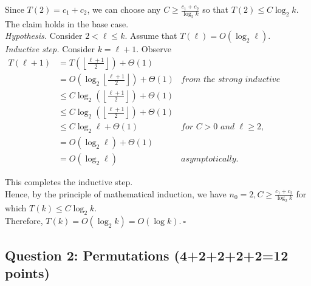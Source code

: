 \begin{solution}
\noindent Since $T(2)=c_1+c_2$, we can choose any $C\geq\frac{c_1+c_2}{\log_2{k}}$ so that $T(2)\leq C\log_2{k}$. The claim holds in the base case.\\

\noindent\textit{Hypothesis. }Consider $2<\ell\leq k$. Assume that $T(\ell)=O(\log_2\ell)$.\\

\noindent\textit{Inductive step. }Consider $k=\ell+1$. Observe
\begin{align*}
T(\ell+1)
&=T\left(\left\lfloor\frac{\ell+1}{2}\right\rfloor\right)+\Theta(1)\\
&=O\left(\log_2\left\lfloor\frac{\ell+1}{2}\right\rfloor\right)+\Theta(1)&\textit{from the strong inductive hypothesis,}\\
&\leq C\log_2\left(\left\lfloor\frac{\ell+1}{2}\right\rfloor\right)+\Theta(1)\\
&\leq C\log_2\left(\left\lfloor\frac{\ell+1}{2}\right\rfloor\right)+\Theta(1)\\
&\leq C\log_2\ell+\Theta(1)&\textit{for $C>0$ and $\ell\geq 2,$}\\
&=O(\log_2\ell)+\Theta(1)\\
&=O(\log_2\ell)&\textit{asymptotically.}
\end{align*}

\noindent This completes the inductive step.\\

\noindent Hence, by the principle of mathematical induction, we have $n_0=2,C\geq\frac{c_1+c_2}{\log_2k}$ for which $T(k)\leq C\log_2k$.\\

\noindent Therefore, $T(k)=O(\log_2k)=O(\log k)$.$~\square$
\end{solution}
\subsection*{Question 2: Permutations (4+2+2+2+2=12 points)}

